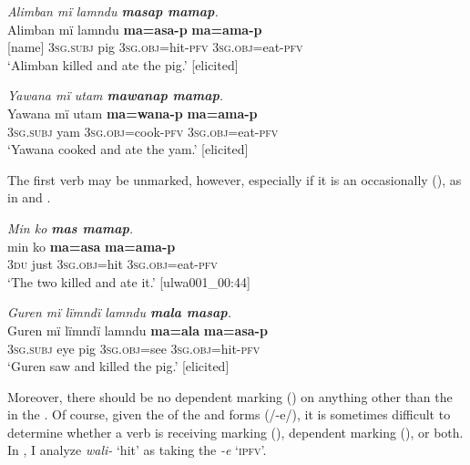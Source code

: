 \ea%
    \label{ex:complex:18}
          \textit{Alimban mï lamndu \textbf{masap mamap}.}\\
\gll Alimban  mï      lamndu  \textbf{ma=asa-p}      \textbf{ma=ama-p}\\
    {}[name]    3\textsc{sg.subj}  pig      3\textsc{sg.obj}=hit-\textsc{pfv}  3\textsc{sg.obj}=eat-\textsc{pfv}\\
\glt `Alimban killed and ate the pig.’ [elicited]
\z

\ea%
    \label{ex:complex:19}
          \textit{Yawana mï utam \textbf{mawanap mamap}.}\\
\gll Yawana  mï      utam  \textbf{ma=wana-p}      \textbf{ma=ama-p}\\
    [name]    3\textsc{sg.subj}  yam  3\textsc{sg.obj}=cook-\textsc{pfv}  \textsc{3sg.obj}=eat-\textsc{pfv}\\
\glt `Yawana cooked and ate the yam.’ [elicited]
\z

The first verb may be unmarked, however, especially if it is an occasionally  (), as in  and .

\ea%
    \label{ex:complex:20}
          \textit{Min ko \textbf{mas mamap}.}\\
\gll min  ko  \textbf{ma=asa}    \textbf{ma=ama-p}\\
    3\textsc{du}  just  3\textsc{sg.obj}=hit  3\textsc{sg.obj}=eat-\textsc{pfv}\\
\glt `The two killed and ate it.’ [ulwa001\_00:44]
\z

\ea%
    \label{ex:complex:21}
          \textit{Guren mï lïmndï lamndu \textbf{mala masap}.}\\
\gll Guren  mï      lïmndï  lamndu  \textbf{ma=ala}    \textbf{ma=asa-p}\\
    [name]  3\textsc{sg.subj}  eye    pig      3\textsc{sg.obj}=see  \textsc{3sg.obj}=hit-\textsc{pfv}\\
\glt `Guren saw and killed the pig.’ [elicited]
\z


Moreover, there should be no dependent marking () on anything other than the  in the . Of course, given the  of the  and  forms (/-e/), it is sometimes difficult to determine whether a verb is receiving  marking (), dependent marking (), or both. In , I analyze \textit{wali-} ‘hit’ as taking the   \textit{-e} ‘\textsc{ipfv}’.

